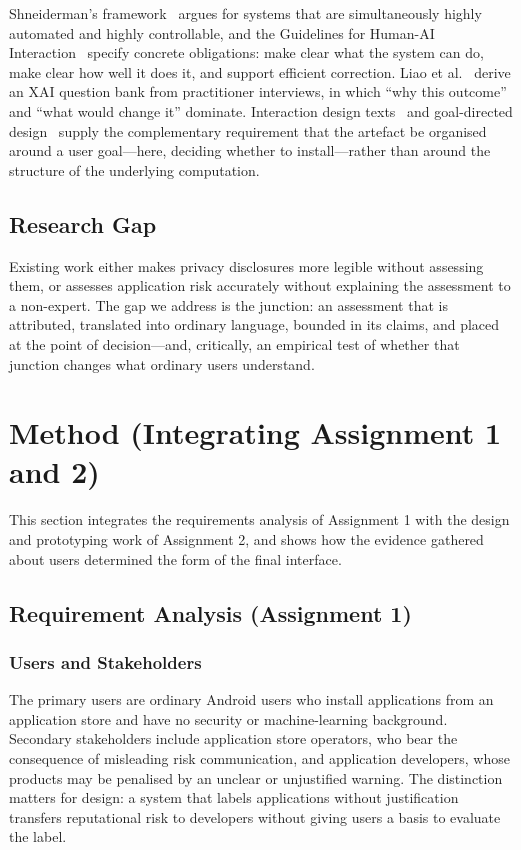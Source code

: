 \documentclass[sigconf]{acmart}
\begin{document}
Shneiderman's framework~\cite{shneiderman2022hcai, shneiderman2020bridging}
argues for systems that are simultaneously highly automated and highly
controllable, and the Guidelines for Human-AI
Interaction~\cite{amershi2019guidelines} specify concrete obligations:
make clear what the system can do, make clear how well it does it, and
support efficient correction. Liao et al.~\cite{liao2020questioning} derive
an XAI question bank from practitioner interviews, in which ``why this
outcome'' and ``what would change it'' dominate. Interaction design
texts~\cite{sharp2019interaction} and goal-directed
design~\cite{cooper2014aboutface} supply the complementary requirement that
the artefact be organised around a user goal---here, deciding whether to
install---rather than around the structure of the underlying computation.

\subsection{Research Gap}

Existing work either makes privacy disclosures more legible without
assessing them, or assesses application risk accurately without explaining
the assessment to a non-expert. The gap we address is the junction: an
assessment that is attributed, translated into ordinary language, bounded
in its claims, and placed at the point of decision---and, critically, an
empirical test of whether that junction changes what ordinary users
understand.

\section{Method (Integrating Assignment 1 and 2)}

This section integrates the requirements analysis of Assignment 1 with the
design and prototyping work of Assignment 2, and shows how the evidence
gathered about users determined the form of the final interface.

\subsection{Requirement Analysis (Assignment 1)}

\subsubsection{Users and Stakeholders}
The primary users are ordinary Android users who install applications from
an application store and have no security or machine-learning background.
Secondary stakeholders include application store operators, who bear the
consequence of misleading risk communication, and application developers,
whose products may be penalised by an unclear or unjustified warning. The
distinction matters for design: a system that labels applications without
justification transfers reputational risk to developers without giving
users a basis to evaluate the label.
\end{document}
